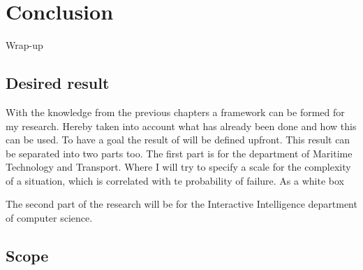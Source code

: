 \section{Conclusion}
\label{sec:conclusion}
Wrap-up

\subsection{Desired result}
With the knowledge from the previous chapters a framework can be formed for my research. Hereby taken into account what has already been done and how this can be used. To have a goal the result of will be defined upfront. 
This result can be separated into two parts too. The first part is for the department of Maritime Technology and Transport. Where I will try to specify a scale for the complexity of a situation, which is correlated with te probability of failure. As a white box 

The second part of the research will be for the Interactive Intelligence department of computer science.

\subsection{Scope}

